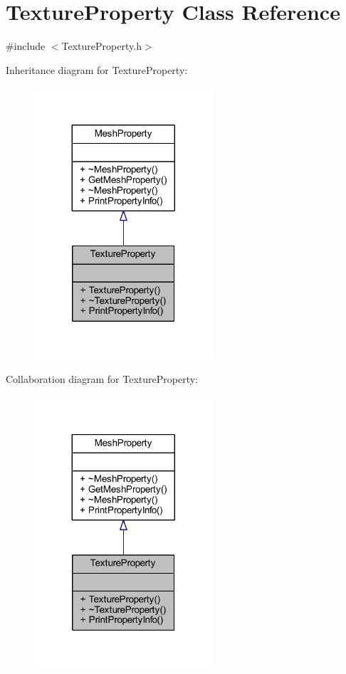 \hypertarget{class_texture_property}{}\section{Texture\+Property Class Reference}
\label{class_texture_property}


{\ttfamily \#include $<$Texture\+Property.\+h$>$}



Inheritance diagram for Texture\+Property\+:\nopagebreak
\begin{figure}[H]
\begin{center}
\leavevmode
\includegraphics[width=188pt]{class_texture_property__inherit__graph}
\end{center}
\end{figure}


Collaboration diagram for Texture\+Property\+:\nopagebreak
\begin{figure}[H]
\begin{center}
\leavevmode
\includegraphics[width=188pt]{class_texture_property__coll__graph}
\end{center}
\end{figure}
